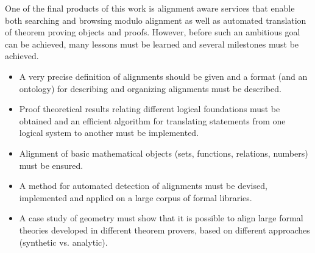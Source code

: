 One of the final products of this work is alignment aware services
that enable both searching and browsing modulo alignment as well as
automated translation of theorem proving objects and proofs.  However,
before such an ambitious goal can be achieved, many lessons must be
learned and several milestones must be achieved.
\begin{itemize}
\item A very precise definition of alignments should be given and a
  format (and an ontology) for describing and organizing alignments
  must be described.
\item Proof theoretical results relating different logical foundations
  must be obtained and an efficient algorithm for translating
  statements from one logical system to another must be implemented.
\item Alignment of basic mathematical objects (sets, functions,
  relations, numbers) must be ensured.
\item A method for automated detection of alignments must be devised,
  implemented and applied on a large corpus of formal libraries.
\item A case study of geometry must show that it is possible to align
  large formal theories developed in different theorem provers, based
  on different approaches (synthetic vs. analytic).
\end{itemize}


